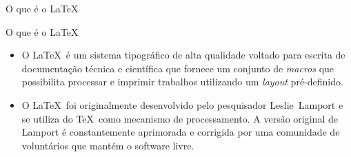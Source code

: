 \documentclass[english,brazil,notheorems]{beamer}
\theoremstyle{definition}
\begin{document}
\begin{frame}{O que é o \LaTeX}
\end{frame}

\begin{frame}{O que é o \LaTeX}
\begin{itemize}
 
 \item O \LaTeX~é um sistema tipográfico de alta qualidade voltado para escrita de documentação técnica e científica que fornece um conjunto de \emph{macros} que possibilita processar e imprimir trabalhos utilizando um \emph{layout} pré-definido.
 
 \item<2->{O \LaTeX~foi originalmente desenvolvido pelo pesquisador \alert<3->{Leslie~Lamport} e se utiliza do \TeX~como mecanismo de processamento. A versão original de Lamport é constantemente aprimorada e corrigida por uma comunidade de voluntários que mantém o software livre.}

\end{itemize}
\end{frame}

%  
\end{document}

